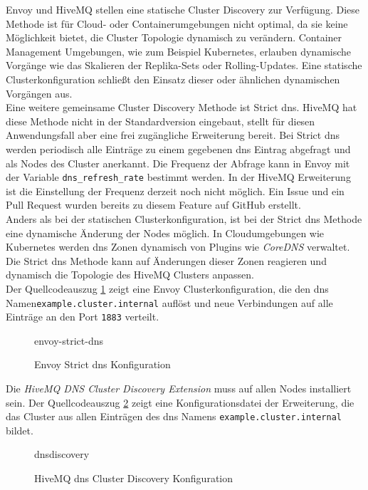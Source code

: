 Envoy und HiveMQ stellen eine statische Cluster Discovery zur Verfügung. Diese Methode ist für Cloud- oder Containerumgebungen nicht optimal, da sie keine Möglichkeit bietet, die Cluster Topologie dynamisch zu verändern. Container Management Umgebungen, wie zum Beispiel Kubernetes, erlauben dynamische Vorgänge wie das Skalieren der Replika-Sets oder Rolling-Updates. Eine statische Clusterkonfiguration schlie{\ss}t den Einsatz dieser oder ähnlichen dynamischen Vorgängen aus.\\
Eine weitere gemeinsame Cluster Discovery Methode ist Strict \ac{dns}. HiveMQ hat diese Methode nicht in der Standardversion eingebaut, stellt für diesen Anwendungsfall aber eine frei zugängliche Erweiterung bereit.
Bei Strict \ac{dns} werden periodisch alle Einträge zu einem gegebenen \ac{dns} Eintrag abgefragt und als Nodes des Cluster anerkannt. Die Frequenz der Abfrage kann in Envoy mit der Variable \verb|dns_refresh_rate| bestimmt werden. In der HiveMQ Erweiterung ist die Einstellung der Frequenz derzeit noch nicht möglich. Ein Issue \cite{AllowConfigurationDiscovery} und ein Pull Request \cite{ExponentialBackoffGeneral} wurden bereits zu diesem Feature auf GitHub erstellt.
\\
Anders als bei der statischen Clusterkonfiguration, ist bei der Strict \ac{dns} Methode eine dynamische Änderung der Nodes möglich. In Cloudumgebungen wie Kubernetes werden \ac{dns} Zonen dynamisch von Plugins wie \textit{CoreDNS} verwaltet.\cite{DNSServicesPods}
Die Strict \ac{dns} Methode kann auf Änderungen dieser Zonen reagieren und dynamisch die Topologie des HiveMQ Clusters anpassen.
\\
Der Quellcodeauszug \ref{code:envoy-strict-dns} zeigt eine Envoy Clusterkonfiguration, die den \ac{dns} Namen\newline \verb|example.cluster.internal| auflöst und neue Verbindungen auf alle Einträge an den Port \verb|1883| verteilt.
\begin{figure}
    {envoy-strict-dns}
    \caption{Envoy Strict \ac{dns} Konfiguration}
    \label{code:envoy-strict-dns}
\end{figure}
Die \textit{HiveMQ DNS Cluster Discovery Extension} \cite{HiveMQExtensionDNS} muss auf allen Nodes installiert sein. Der Quellcodeauszug \ref{code:hivemq-dnsdiscovery} zeigt eine Konfigurationsdatei der Erweiterung, die das Cluster aus allen Einträgen des \ac{dns} Namens \verb|example.cluster.internal| bildet.
\begin{figure}
    {dnsdiscovery}
    \caption{HiveMQ \ac{dns} Cluster Discovery Konfiguration}
    \label{code:hivemq-dnsdiscovery}
\end{figure}

